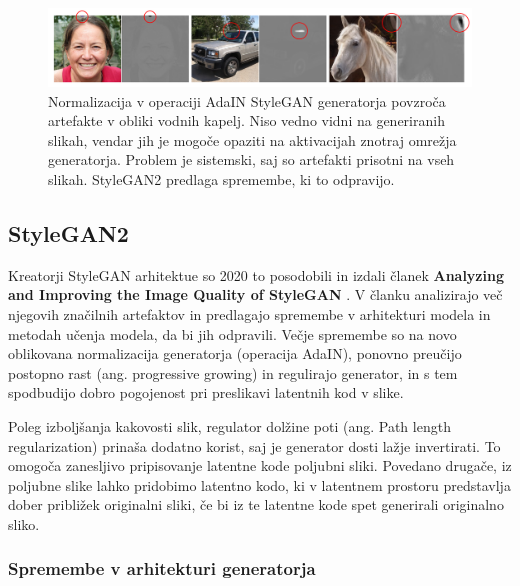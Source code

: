 \documentclass[a4paper,12pt,openright]{book}
\begin{document}
\begin{figure}[htb]
\begin{center}
  \includegraphics[width=1\textwidth]{images/stylegan_artefacts.png}
\end{center}
  \caption{Normalizacija v operaciji AdaIN StyleGAN generatorja povzroča artefakte v obliki vodnih kapelj. Niso vedno vidni na generiranih slikah, vendar jih je mogoče opaziti na aktivacijah znotraj omrežja generatorja. Problem je sistemski, saj so artefakti prisotni na vseh slikah. StyleGAN2 predlaga spremembe, ki to odpravijo. }
  \label{Artefakti}
\end{figure}



\subsection{StyleGAN2}

Kreatorji StyleGAN arhitektue so 2020 to posodobili in izdali članek \textbf{Analyzing and Improving the Image Quality of StyleGAN} \cite{Karras2019stylegan2}. V članku analizirajo več njegovih značilnih artefaktov in predlagajo spremembe v arhitekturi modela in metodah učenja modela, da bi jih odpravili. Večje spremembe so na novo oblikovana normalizacija generatorja (operacija AdaIN), ponovno preučijo postopno rast (ang. progressive growing) in regulirajo generator, in s tem spodbudijo dobro pogojenost pri preslikavi latentnih kod v slike. 

Poleg izboljšanja kakovosti slik, regulator dolžine poti (ang. Path length regularization) prinaša dodatno korist, saj je generator dosti lažje invertirati. To omogoča zanesljivo pripisovanje latentne kode poljubni sliki. Povedano drugače, iz poljubne slike lahko pridobimo latentno kodo, ki v latentnem prostoru predstavlja dober približek originalni sliki, če bi iz te latentne kode spet generirali originalno sliko. 



\subsubsection{Spremembe v arhitekturi generatorja}
\end{document}
